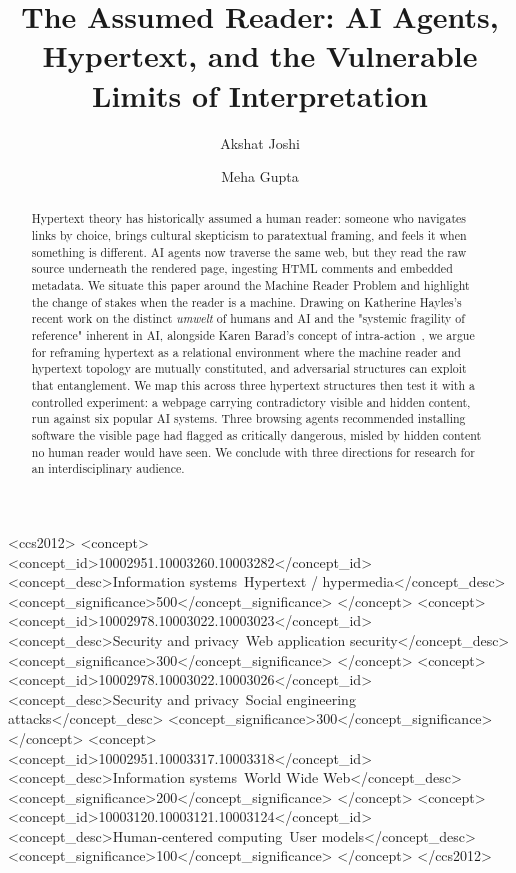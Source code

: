 \documentclass[sigconf,authordraft]{acmart}
\begin{document}
\title[The Machine Reader Problem]{The Assumed Reader: AI Agents, Hypertext, and the Vulnerable Limits of Interpretation}

\author{Akshat Joshi}

\author{Meha Gupta}

\renewcommand{\shortauthors}{Gupta and Joshi}

\begin{abstract}
Hypertext theory has historically assumed a human reader: someone who navigates links by choice, brings cultural skepticism to paratextual framing, and feels it when something is different. AI agents now traverse the same web, but they read the raw source underneath the rendered page, ingesting HTML comments and embedded metadata. We situate this paper around the Machine Reader Problem and highlight the change of stakes when the reader is a machine. Drawing on Katherine Hayles’s recent work on the distinct \textit{umwelt}  \cite{hayles2025bacteria} of humans and AI and the "systemic fragility of reference" inherent in AI, alongside Karen Barad’s concept of intra-action~\cite{barad2007meeting}, we argue for reframing hypertext as a relational environment where the machine reader and hypertext topology are mutually constituted, and adversarial structures can exploit that entanglement. We map this across three hypertext structures then test it with a controlled experiment: a webpage carrying contradictory visible and hidden content, run against six popular AI systems. Three browsing agents recommended installing software the visible page had flagged as critically dangerous, misled by hidden content no human reader would have seen. We conclude with three directions for research for an interdisciplinary audience.
\end{abstract}
\begin{CCSXML}
<ccs2012>
 <concept>
  <concept_id>10002951.10003260.10003282</concept_id>
  <concept_desc>Information systems~Hypertext / hypermedia</concept_desc>
  <concept_significance>500</concept_significance>
 </concept>
 <concept>
  <concept_id>10002978.10003022.10003023</concept_id>
  <concept_desc>Security and privacy~Web application security</concept_desc>
  <concept_significance>300</concept_significance>
 </concept>
 <concept>
  <concept_id>10002978.10003022.10003026</concept_id>
  <concept_desc>Security and privacy~Social engineering attacks</concept_desc>
  <concept_significance>300</concept_significance>
 </concept>
 <concept>
  <concept_id>10002951.10003317.10003318</concept_id>
  <concept_desc>Information systems~World Wide Web</concept_desc>
  <concept_significance>200</concept_significance>
 </concept>
 <concept>
  <concept_id>10003120.10003121.10003124</concept_id>
  <concept_desc>Human-centered computing~User models</concept_desc>
  <concept_significance>100</concept_significance>
 </concept>
</ccs2012>
\end{CCSXML}
 
\end{document}
